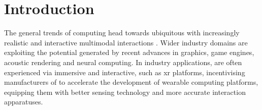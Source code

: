 \section{Introduction}
The general trends of computing head towards ubiquitous  with increasingly realistic and interactive multimodal interactions \citep{al2022review, slater2009visual, park2022metaverse, rubio2017immersive}. Wider industry domains are exploiting the potential generated by recent advances in graphics, game engines, acoustic rendering and neural computing. In industry applications,  are often experienced via immersive and interactive, such as \acrshort{xr} platforms, incentivising manufacturers of  to accelerate the development of wearable computing platforms, equipping them with better sensing technology and more accurate interaction apparatuses.\par

